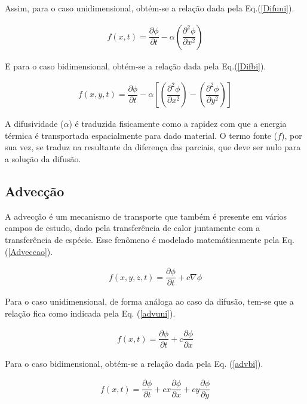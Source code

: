 	Assim, para o caso unidimensional, obtém-se a relação dada pela Eq.(\ref{Difuni}).
	
\begin{align}
 \label{Difuni}
 f(x,t) = \dfrac{\partial \phi}{\partial t} - \alpha \left(\dfrac{\partial^2 \phi}{\partial x^2}\right)
\end{align}

	E para o caso bidimensional, obtém-se a relação dada pela Eq.(\ref{Difbi}).
	
\begin{align}
 \label{Difbi}
 f(x,y,t) = \dfrac{\partial \phi}{\partial t} - \alpha \left[ \left(\dfrac{\partial^2 \phi}{\partial x^2}\right) - \left(\dfrac{\partial^2 \phi}{\partial y^2}\right)\right]
\end{align}
	
	A difusividade ($\alpha$) é traduzida fisicamente como a rapidez com que a energia térmica é transportada espacialmente para dado material. O termo fonte ($f$), por sua vez, se traduz na resultante da diferença das parciais, que deve ser nulo para a solução da difusão. 

\subsection{Advecção}

\noindent

	A advecção é um mecanismo de transporte que também é presente em vários campos de estudo, dado pela transferência de calor juntamente com a transferência de espécie. Esse fenômeno é modelado matemáticamente pela Eq. (\ref{Adveccao}).
	
\begin{align}
\label{Adveccao}
f(x,y,z,t) = \dfrac{\partial \phi}{\partial t} + c \nabla \phi
\end{align}

	Para o caso unidimensional, de forma análoga ao caso da difusão, tem-se que a relação fica como indicada pela Eq. (\ref{advuni}).
	
\begin{align}
\label{advuni}
f(x,t) = \dfrac{\partial \phi}{\partial t} + c \dfrac{\partial \phi}{\partial x}
\end{align}

	Para o caso bidimensional, obtém-se a relação dada pela Eq. (\ref{advbi}).
	
\begin{align}
\label{advbi}
f(x,t) = \dfrac{\partial \phi}{\partial t} + cx \dfrac{\partial \phi}{\partial x} + cy \dfrac{\partial \phi}{\partial y}
\end{align}
	
